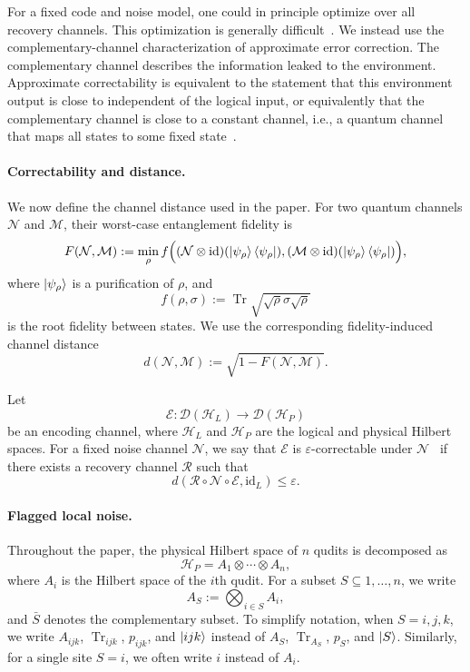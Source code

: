 \documentclass[10pt,twocolumn,superscriptaddress,aps,amsmath,amssymb,citeautoscript,floatfix,prx]{revtex4-2}
\theoremstyle{plain}
\theoremstyle{plain}
\theoremstyle{plain}
\theoremstyle{plain}
\theoremstyle{plain}
\theoremstyle{plain}
\begin{document}
For a fixed code and noise model, one could in principle optimize over all recovery channels. This optimization is generally difficult~\cite{PhysRevA.75.012338}. We instead use the complementary-channel characterization of approximate error correction. The complementary channel describes the information leaked to the environment. Approximate correctability is equivalent to the statement that this environment output is close to independent of the logical input, or equivalently that the complementary channel is close to a constant channel, i.e., a quantum channel that maps all states to some fixed state~\cite{Beny2010, Faist2020}.

\paragraph{Correctability and distance.}

We now define the channel distance used in the paper. For two quantum channels $\mathcal N$ and $\mathcal M$, their worst-case entanglement fidelity is
$$
\begin{aligned}
F(\mathcal N,\mathcal M)
:=
\min_\rho
f\Big(
(\mathcal N\otimes\mathrm{id})
(\ket{\psi_\rho}\bra{\psi_\rho}),
(\mathcal M\otimes\mathrm{id})
(\ket{\psi_\rho}\bra{\psi_\rho})
\Big),
\end{aligned}
$$
where $\ket{\psi_\rho}$ is a purification of $\rho$, and
$$
f(\rho,\sigma)
:=
\operatorname{Tr}
\sqrt{\sqrt\rho\sigma\sqrt\rho}
$$
is the root fidelity between states. We use the corresponding fidelity-induced channel distance
\begin{equation}\label{eq:distance_def}
d(\mathcal N,\mathcal M)
:=
\sqrt{1-F(\mathcal N,\mathcal M)} .
\end{equation}

Let
$$
\mathcal E:
\mathcal D(\mathcal H_L)
\to
\mathcal D(\mathcal H_P)
$$
be an encoding channel, where $\mathcal H_L$ and $\mathcal H_P$ are the logical and physical Hilbert spaces. For a fixed noise channel $\mathcal N$, we say that $\mathcal E$ is $\varepsilon$-correctable under $\mathcal N$~\cite{Beny2010} if there exists a recovery channel $\mathcal R$ such that
$$
d(\mathcal R\circ\mathcal N\circ\mathcal E,\mathrm{id}_L)
\le
\varepsilon .
$$

\paragraph{Flagged local noise.}

Throughout the paper, the physical Hilbert space of $n$ qudits is decomposed as
$$
\mathcal H_P
=
A_1\otimes\cdots\otimes A_n,
$$
where $A_i$ is the Hilbert space of the $i$th qudit. For a subset $S\subseteq{1,\ldots,n}$, we write
$$
A_S
:=
\bigotimes_{i\in S}A_i,
$$
and $\bar S$ denotes the complementary subset. To simplify notation, when $S={i,j,k}$, we write $A_{ijk}$, $\operatorname{Tr}_{ijk}$, $p_{ijk}$, and $\ket{ijk}$ instead of $A_S$, $\operatorname{Tr}_{A_S}$, $p_S$, and $\ket S$. Similarly, for a single site $S={i}$, we often write $i$ instead of $A_i$.
\end{document}
